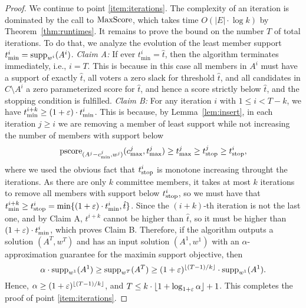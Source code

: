 \begin{proof}
We continue to point \ref{item:iterations}. The complexity of an iteration is dominated by the call to $\operatorname{MaxScore}$, which takes time $O(|E|\cdot \log k)$ by Theorem~\ref{thm:runtimes}. 
It remains to prove the bound on the number $T$ of total iterations. 
To do that, we analyze the evolution of the least member support $t^i_{\min}=\operatorname{supp}_{w^i}(A^i)$. 
\emph{Claim A:} If ever $t^i_{\min}=\hat{t}$, then the algorithm terminates immediately, i.e., $i=T$. This is because in this case all members in $A^i$ must have a support of exactly $\hat{t}$, all voters a zero slack for threshold $\hat{t}$, and all candidates in $C\setminus A^i$ a zero parameterized score for $\hat{t}$, and hence a score strictly below $\hat{t}$, and the stopping condition is fulfilled.
\emph{Claim B:} For any iteration $i$ with $1\leq i<T-k$, we have $t^{i+k}_{\min}\geq (1+\varepsilon)\cdot t^{i}_{\min}$. This is because, by Lemma~\ref{lem:insert}, in each iteration $j\geq i$ we are removing a member of least support while not increasing the number of members with support below 
$$\operatorname{pscore}_{(A^j - c^j_{\min}, w^j)}(c^j_{\max}, t^j_{\max})\geq t^j_{\max}\geq t^j_{\operatorname*{stop}}\geq t^i_{\operatorname*{stop}},$$
where we used the obvious fact that $t^i_{\operatorname*{stop}}$ is monotone increasing throught the iterations.  
As there are only $k$ committee members, it takes at most $k$ iterations to remove all members with support below $t^i_{\operatorname*{stop}}$, so we must have that $t^{i+k}_{\min}\geq t^i_{\operatorname*{stop}}=\min\{(1+\varepsilon)\cdot t^i_{\min}, \hat{t}\}$. 
Since the $(i+k)$-th iteration is not the last one, and by Claim A,  $t^{i+k}$ cannot be higher than $\hat{t}$, so it must be higher than $(1+\varepsilon)\cdot t^i_{\min}$, which proves Claim B.
Therefore, if the algorithm outputs a solution $(A^T,w^T)$ and has an input solution $(A^1, w^1)$ with an $\alpha$-approximation guarantee for the maximin support objective, then 
$$\alpha\cdot \operatorname{supp}_{w^1}(A^1) \geq \operatorname{supp}_{w^T}(A^T) \geq (1+\varepsilon)^{\lfloor (T-1)/k \rfloor} \cdot \operatorname{supp}_{w^1}(A^1).$$
Hence, $\alpha\geq (1+\varepsilon)^{\lfloor (T-1)/k \rfloor}$, and $T\leq k\cdot \lfloor 1+\log_{1+\varepsilon} \alpha \rfloor+1$. This completes the proof of point \ref{item:iterations}.
\end{proof}